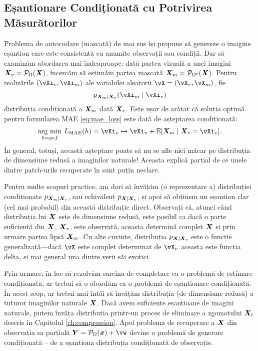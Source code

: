\documentclass[../../book-main_ro.tex]{subfiles}
\begin{document}
\subsection{Eșantionare Condiționată cu Potrivirea Măsurătorilor}
\label{sec:conditioned-decoding}
Problema de autocodare (mascată) de mai sus își propune să genereze o imagine eșantion care este consistentă cu anumite observații sau condiții. Dar să examinăm abordarea mai îndeaproape: dată
partea vizuală a unei imagini $\bm{X}_v = \mathcal{P}_{\Omega}(\bm{X})$, încercăm să
estimăm partea mascată $\bm{X}_m = \mathcal{P}_{\Omega^c}(\bm{X})$. Pentru realizările
$(\vXi_v, \vXi_m)$ ale variabilei aleatorii $\vX=(\vX_v, \vX_m)$, fie
\[p_{\X_m \mid \X_v}(\vXi_m\mid \vXi_v)\]
distribuția condiționată a $\bm{X}_m$ dată
$\bm{X}_v$. Este ușor de arătat că soluția optimă pentru formularea MAE
\eqref{eq:mae_loss} este dată de așteptarea condiționată:
\begin{equation}
  \argmin_{h = g \circ f}\, L_{\mathrm{MAE}}(h)
  = \vXi_v \mapsto \vXi_v + \mathbb{E}[\X_m \mid \X_v=\vXi_v].
\end{equation}
În general, totuși, această așteptare poate să nu se afle nici măcar pe
distribuția de dimensiune redusă a imaginilor naturale! Aceasta explică parțial
de ce unele dintre patch-urile recuperate în 
sunt puțin neclare.

Pentru multe scopuri practice, am dori să învățăm (o reprezentare
a) distribuției condiționate $p_{\bm{X}_m \mid \bm{X}_v}$, sau echivalent
$p_{\bm{X} \mid \bm{X}_v}$,
și apoi să obținem un eșantion clar (cel mai probabil) din această distribuție direct. Observați că, atunci când distribuția lui $\bm{X}$ este de dimensiune redusă, este posibil ca dacă o
parte suficientă din $\bm{X}$, $\bm{X}_v$, este observată, aceasta determină complet
$\bm{X}$ și prin urmare partea lipsă $\bm{X}_m$. Cu alte cuvinte, distribuția
$p_{\bm{X} \mid \bm{X}_v}$ este o funcție generalizată---dacă $\vX$ este complet determinat de $\vX_v$ aceasta este funcția delta, și mai general una dintre verii săi exotici.

Prin urmare, în loc să rezolvăm sarcina de completare ca o problemă de estimare condiționată, ar trebui să o abordăm ca o problemă de eșantionare condiționată. În acest scop, ar trebui mai întâi să învățăm distribuția (de dimensiune redusă) a tuturor imaginilor naturale $\bm{X}$. Dacă avem suficiente eșantioane de imagini naturale, putem învăța distribuția printr-un proces de eliminare a zgomotului $\bm{X}_t$ descris în Capitolul \ref{ch:compression}. Apoi problema de recuperare a $\bm{X}$ din observația sa parțială $\Y = \mathcal{P}_\Omega(\x) +\vw$ devine o problemă de generare condiționată -- de a eșantiona distribuția condiționată de observație.
\end{document}
